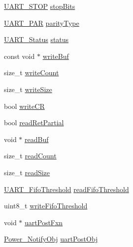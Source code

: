 \begin{DoxyCompactItemize}
\item 
\hyperlink{_u_a_r_t_8h_a176b71ca19bc13d7534fa30fc18c2243}{U\+A\+R\+T\+\_\+\+S\+T\+O\+P} \hyperlink{struct_u_a_r_t_c_c26_x_x___object_ae5a931f5b2f5de1c3aa6852856ca1b4a}{stop\+Bits}
\item 
\hyperlink{_u_a_r_t_8h_ac70b5aa75500b8c45a51ec560deccfc4}{U\+A\+R\+T\+\_\+\+P\+A\+R} \hyperlink{struct_u_a_r_t_c_c26_x_x___object_ab42ca16e6fc784e7d0a727b1e9c6b299}{parity\+Type}
\item 
\hyperlink{_u_a_r_t_c_c26_x_x_8h_a778bbef5f4b52a5651552136715f53c4}{U\+A\+R\+T\+\_\+\+Status} \hyperlink{struct_u_a_r_t_c_c26_x_x___object_a10ff4c367c40263e72d3494f78b9ce07}{status}
\item 
const void $\ast$ \hyperlink{struct_u_a_r_t_c_c26_x_x___object_a440f4f4b165c4c725e544f13ad9ed02b}{write\+Buf}
\item 
size\+\_\+t \hyperlink{struct_u_a_r_t_c_c26_x_x___object_ac1e9fe4a759db1bb57ea9e50af9b08c2}{write\+Count}
\item 
size\+\_\+t \hyperlink{struct_u_a_r_t_c_c26_x_x___object_a6532e1f4a50fcf7e6908f7502a64fea6}{write\+Size}
\item 
bool \hyperlink{struct_u_a_r_t_c_c26_x_x___object_adc03957f1fbafe66c14fd7d9308a5e71}{write\+C\+R}
\item 
bool \hyperlink{struct_u_a_r_t_c_c26_x_x___object_af8d33692f51db0e0874b0568e7011e78}{read\+Ret\+Partial}
\item 
void $\ast$ \hyperlink{struct_u_a_r_t_c_c26_x_x___object_a9672e42f229731578af8a2c81f3f84db}{read\+Buf}
\item 
size\+\_\+t \hyperlink{struct_u_a_r_t_c_c26_x_x___object_a860c348843ce491dc8787304ddc84f38}{read\+Count}
\item 
size\+\_\+t \hyperlink{struct_u_a_r_t_c_c26_x_x___object_abefd4ca2a4db441a73e8b373a6947f85}{read\+Size}
\item 
\hyperlink{_u_a_r_t_c_c26_x_x_8h_a292a5e751577698b215f5e8aa1c79e99}{U\+A\+R\+T\+\_\+\+Fifo\+Threshold} \hyperlink{struct_u_a_r_t_c_c26_x_x___object_a8d3886d0973101575bac69dc7bf5d587}{read\+Fifo\+Threshold}
\item 
uint8\+\_\+t \hyperlink{struct_u_a_r_t_c_c26_x_x___object_aad6be8e2a10e4a97ef30de3bc00f74d6}{write\+Fifo\+Threshold}
\item 
void $\ast$ \hyperlink{struct_u_a_r_t_c_c26_x_x___object_a990a1d69fb8edf1e88f47e01f7de4e5f}{uart\+Post\+Fxn}
\item 
\hyperlink{struct_power___notify_obj}{Power\+\_\+\+Notify\+Obj} \hyperlink{struct_u_a_r_t_c_c26_x_x___object_a06f854831de50d17f7249224f560cdd5}{uart\+Post\+Obj}

\end{DoxyCompactItemize}
